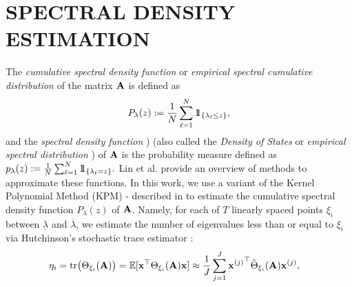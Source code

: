 \documentclass{article}
\begin{document}
\section{SPECTRAL DENSITY ESTIMATION}
The \emph{cumulative spectral density function} or \emph{empirical spectral cumulative distribution} of the matrix ${\bf A}$ is defined as 
\begin{align} \label{Eq:cdf}
P_{\lambda}(z):=\frac{1}{N}\sum_{\ell=1}^{N} 1\!\!1_{\left\{\lambda_{\ell}\leq z\right\}},
\end{align}
and the \emph{spectral density function} \cite[Chapter 6]{van_mieghem}) (also called the \emph{Density of States} or \emph{empirical spectral distribution} \cite[Chapter 2.4]{tao_random_matrix}) of ${\bf A}$ is the probability measure defined as 
$p_{\lambda}(z):=\frac{1}{N}\sum_{\ell=1}^{N} 1\!\!1_{\left\{\lambda_{\ell}=z\right\}}.$
Lin et al. \cite{lin_spectral_density} provide an %
overview of methods to approximate these functions. In this work, we use a variant of the Kernel Polynomial Method (KPM) \cite{silver1994densities}\nocite{silver1996kernel}-\cite{wang1994calculating} described in \cite{lin_spectral_density,mcsfb} to estimate the cumulative spectral density function $P_{\lambda}(z)$ of ${\bf A}$. Namely, for each of $T$ linearly spaced points $\xi_i$ between $\underline{\lambda}$ and $\overline{\lambda}$, we estimate the number of eigenvalues less than or equal to $\xi_i$ via Hutchinson's stochastic trace estimator \cite{hutchinson}:
\begin{align}\label{Eq:eig_count}
\eta_i =\mbox{tr}\bigl(\Theta_{\xi_i}({\bf A})\bigr)
=\mathbb{E}[{\bf x}^{\top}\Theta_{\xi_i}({\bf A}){\bf x}]   
&\approx \frac{1}{J} \sum_{j=1}^J {{\bf x}^{(j)}}^{\top}\tilde{\Theta}_{\xi_i}({\bf A}){\bf x}^{(j)},
\end{align}
\end{document}
